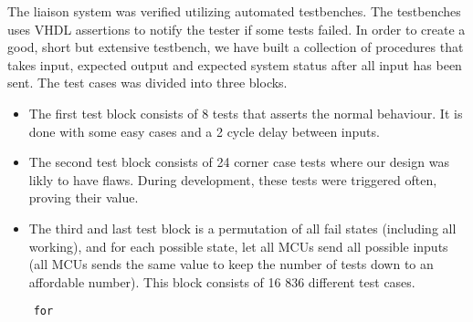 The liaison system was verified utilizing automated testbenches. The testbenches uses VHDL assertions to notify the tester if some
tests failed. In order to create a good, short but extensive testbench, we have built a collection of procedures that takes input, expected output
and expected system status after all input has been sent. The test cases was divided into three blocks.
\begin{itemize}
\item The first test block consists of 8 tests that asserts the normal behaviour. It is done with some easy cases and a 2 cycle delay between inputs.

\item The second test block consists of 24 corner case tests where our design was likly to have flaws. During development, these tests were
triggered often, proving their value.   

\item The third and last test block is a permutation of all fail states (including all working), and for each possible state, let all MCUs send
all possible inputs (all MCUs sends the same value to keep the number of tests down to an affordable number). This block consists of 16 836 different test cases.
\end{itemize}

\begin{lstlisting}
    for 
\end{lstlisting}
